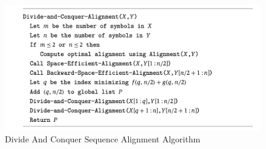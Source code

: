 \begin{exercise}
\begin{solution}
  \begin{figure}
    \centering
    \includegraphics[width=12cm]{img/ex3-1.png}
    \caption{Divide And Conquer Sequence Alignment Algorithm \label{fig:ex4}}
  \end{figure}


\end{solution}
\end{exercise}
